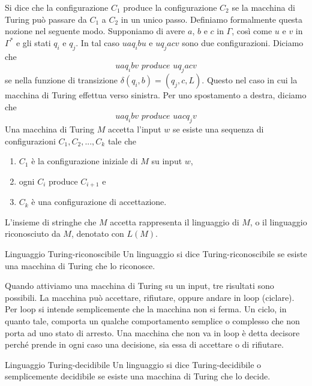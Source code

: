 Si dice che la configurazione $C_{1}$ produce la configurazione $C_{2}$ se la macchina di Turing può passare da $C_{1}$ a $C_{2}$ in un unico passo. Definiamo formalmente questa nozione nel seguente modo. Supponiamo di avere $a$, $b$ e $c$ in $\Gamma$, così come $u$ e $v$ in $\Gamma^*$ e gli stati $q_{i}$ e $q_j$. In tal caso $uaq_{i}bu$ e $uq_{j}acv$ sono due configurazioni. Diciamo che 
\begin{equation*}
    uaq_ibv \textit{ produce } uq_jacv
\end{equation*}
se nella funzione di transizione $\delta(q_{i}, b) = (q_{j}, c, L)$. Questo nel caso in cui la macchina di Turing effettua verso sinistra. Per uno spostamento a destra, diciamo che
\begin{equation}
    uaq_ibv \textit{ produce }uacq_jv
\end{equation}
Una macchina di Turing $M$ accetta l'input $w$ se esiste una sequenza di configurazioni $C_{1}, C_{2} ,...,C_k$ tale che
\begin{enumerate}
    \item $C_{1}$ è la configurazione iniziale di $M$ su input $w$,
    \item ogni $C_{i}$ produce $C_{i+1}$ e
    \item $C_{k}$ è una configurazione di accettazione.
\end{enumerate}
L'insieme di stringhe che $M$ accetta rappresenta il linguaggio di $M$, o il linguaggio riconosciuto da $M$, denotato con $L(M)$.

\begin{Definition}{Linguaggio Turing-riconoscibile}{}
Un linguaggio si dice Turing-riconoscibile se esiste una macchina di Turing che lo riconosce.
\end{Definition}

Quando attiviamo una macchina di Turing su un input, tre risultati sono possibili. La macchina può accettare, rifiutare, oppure andare in loop (ciclare). Per loop si intende semplicemente che la macchina non si ferma. Un ciclo, in quanto tale, comporta un qualche comportamento semplice o complesso che non porta ad uno stato di arresto. Una macchina che non va in loop è detta decisore perché prende in ogni caso una decisione, sia essa di accettare o di rifiutare. 

\begin{Definition}{Linguaggio Turing-decidibile}{}
Un linguaggio si dice Turing-decidibile o semplicemente decidibile se esiste una macchina di Turing che lo decide.    
\end{Definition}

